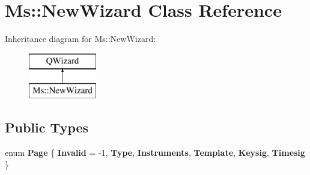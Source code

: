 \hypertarget{class_ms_1_1_new_wizard}{}\section{Ms\+:\+:New\+Wizard Class Reference}
\label{class_ms_1_1_new_wizard}
Inheritance diagram for Ms\+:\+:New\+Wizard\+:\begin{figure}[H]
\begin{center}
\leavevmode
\includegraphics[height=2.000000cm]{class_ms_1_1_new_wizard}
\end{center}
\end{figure}
\subsection*{Public Types}
\begin{DoxyCompactItemize}
\item 
\mbox{\label{class_ms_1_1_new_wizard_aa5e50d85d587a6e29d9d87887f385ca0}} 
enum {\bfseries Page} \{ \newline
{\bfseries Invalid} = -\/1, 
{\bfseries Type}, 
{\bfseries Instruments}, 
{\bfseries Template}, 
\newline
{\bfseries Keysig}, 
{\bfseries Timesig}
 \}
\end{DoxyCompactItemize}
